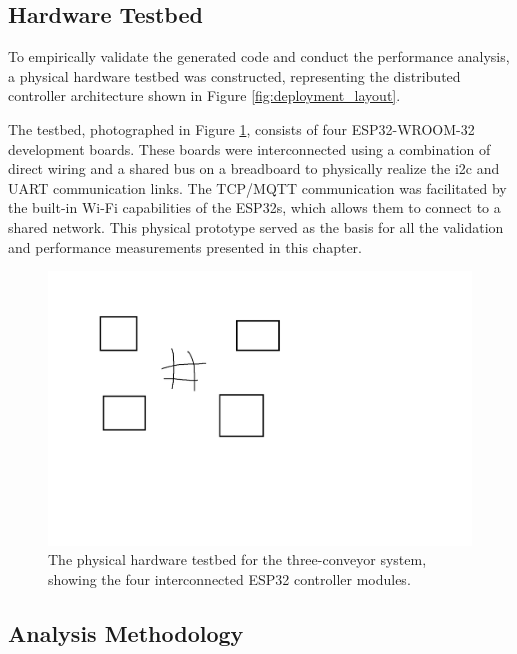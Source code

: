 \subsection{Hardware Testbed}
\label{subsec:hardware_setup}

To empirically validate the generated code and conduct the performance analysis, a physical hardware testbed was constructed, representing the distributed controller architecture shown in Figure \ref{fig:deployment_layout}. 

The testbed, photographed in Figure \ref{fig:hardware_photo}, consists of four ESP32-WROOM-32 development boards. These boards were interconnected using a combination of direct wiring and a shared bus on a breadboard to physically realize the \gls{i2c} and UART communication links. The TCP/MQTT communication was facilitated by the built-in Wi-Fi capabilities of the ESP32s, which allows them to connect to a shared network. This physical prototype served as the basis for all the validation and performance measurements presented in this chapter.

\begin{figure}[htb!]
    \centering
    \includegraphics[width=0.9\columnwidth]{Chapters/Figures/photo_of_setup.png}
    \caption{The physical hardware testbed for the three-conveyor system, showing the four interconnected ESP32 controller modules.}
    \label{fig:hardware_photo}
\end{figure}


\subsection{Analysis Methodology}
\label{subsec:analysis_methodology}

